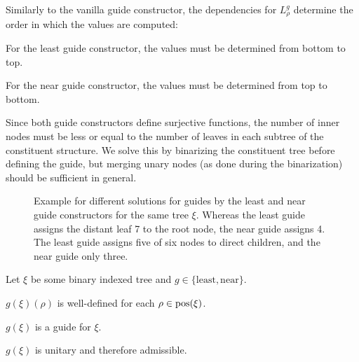 \documentclass[../../document.tex]{subfiles}
\begin{document}
    Similarly to the vanilla guide constructor, the dependencies for \(L^g_\rho\) determine the order in which the values are computed:
    \begin{inparaenum}
        \item For the least guide constructor, the values must be determined from bottom to top.
        \item For the near guide constructor, the values must be determined from top to bottom.
    \end{inparaenum}
    Since both guide constructors define surjective functions, the number of inner nodes must be less or equal to the number of leaves in each subtree of the constituent structure.
    We solve this by binarizing the constituent tree before defining the guide, but merging unary nodes (as done during the binarization) should be sufficient in general.

    \begin{figure}
        \null\hfill
        \begin{minipage}{.35\linewidth}
            \centering
            
        \end{minipage}
        \hfill
        \begin{minipage}{.35\linewidth}
            \centering
            
        \end{minipage}
        \hfill\null
        \caption{\label{fig:guides:diff}
            Example for different solutions for guides by the least and near guide constructors for the same tree \(\xi\).
            Whereas the least guide assigns the distant leaf 7 to the root node, the near guide assigns 4.
            The least guide assigns five of six nodes to direct children, and the near guide only three.
        }
    \end{figure}

    \begin{claim}
        Let \(\xi\) be some binary indexed tree and \(g \in \{\mathrm{least}, \mathrm{near}\}\).
        \begin{compactenum}
            \item \(g(\xi)(\rho)\) is well-defined for each \(\rho \in \operatorname{pos}(\xi)\).
            \item \(g(\xi)\) is a guide for \(\xi\).
            \item \(g(\xi)\) is unitary and therefore admissible.
        \end{compactenum}
    \end{claim}
\end{document}
